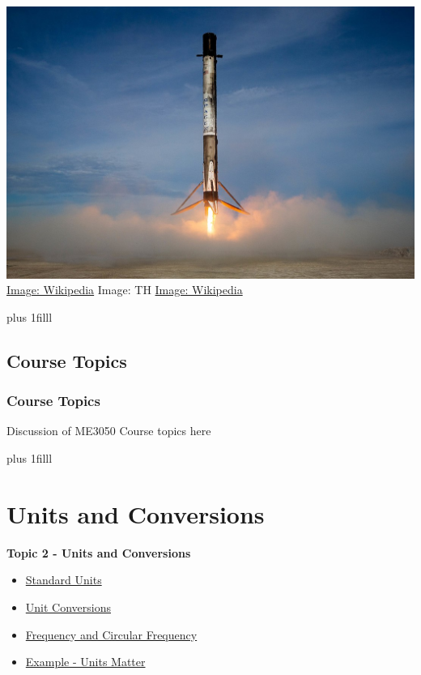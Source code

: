 \documentclass[fleqn]{beamer} %
\newcommand{\sectionIItitle}{Units and Conversions}
\newcommand{\sectionIsubsectionIVtitle}{Course Topics}
\newcommand{\sectionIIsubsectionItitle}{Standard Units}
\newcommand{\sectionIIsubsectionIItitle}{Unit Conversions}
\newcommand{\sectionIIsubsectionIIItitle}{Frequency and Circular Frequency}
\newcommand{\sectionIIsubsectionIVtitle}{Example - Units Matter}
\newcommand{\btVFill}{\vskip0pt plus 1filll}
\begin{document}
\begin{frame}
				\includegraphics[scale=.1]{images/falcon9_fig2.jpg} \\
				{\tiny\href{https://en.wikipedia.org/wiki/Phantom_(UAV)}{Image: Wikipedia} \hspace{20mm}Image: TH \hspace{20mm}\href{https://en.wikipedia.org/wiki/SpaceX\#/media/File:CRS-18_Mission_(48380511427).jpg}{Image: Wikipedia} }

				\btVFill
			\end{frame}	

		\subsection{\sectionIsubsectionIVtitle}\label{sectionIsubsectionIV}	

			\begin{frame}
				\frametitle{\sectionIsubsectionIVtitle}
				\bigskip
				Discussion of ME3050 Course topics here

				\btVFill
			\end{frame}
	
	\section{\sectionIItitle}\label{sectionII}

		\begin{frame}
			\large \textbf{Topic 2 - \sectionIItitle} \vspace{3mm}\\

			\begin{itemize}
				\item \hyperlink{sectionIIsubsectionI}{\sectionIIsubsectionItitle} \vspc %
				\item \hyperlink{sectionIIsubsectionII}{\sectionIIsubsectionIItitle} \vspc %
				\item \hyperlink{sectionIIsubsectionIII}{\sectionIIsubsectionIIItitle} \vspc %
				\item \hyperlink{sectionIIsubsectionIV}{\sectionIIsubsectionIVtitle} \vspc %
			\end{itemize}

		\end{frame}
\end{document}
